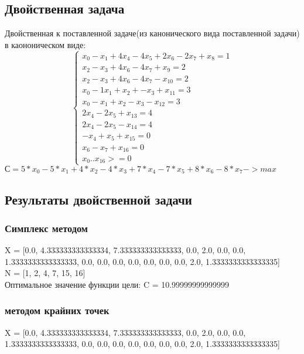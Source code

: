 \documentclass[a4]{article}
\begin{document}
			\subsection{Двойственная задача}
			Двойственная к поставленной задаче(из канонического вида поставленной задачи) в каононическом виде:
			\begin{equation*}
				\begin{cases}
					x_0 -x_1 + 4x_4 - 4x_5 + 2x_6 - 2x_7 + x_8 = 1\\
					x_2 - x_3 + 4x_6 - 4x_7 + x_9 = 2\\
					x_2 -x_3 + 4x_6 - 4x_7 - x_{10} = 2\\
					x_0 -1x_1 + x_2 + -x_3 + x_{11} = 3\\
					x_0 - x_1 + x_2 -x_3 - x_{12} = 3\\
					2x_4 - 2x_5 + x_{13} = 4\\
					2x_4 -2x_5 - x_{14} = 4\\
					-x_4 + x_5 + x_{15} = 0\\
					x_6 -x_7 + x_{16} = 0\\
					x_0.. x_{16} >= 0 
				\end{cases}
			\end{equation*}
			$С = 5*x_0 - 5*x_1 + 4*x_2 - 4*x_3 + 7*x_4 - 7*x_5 + 8*x_6 - 8*x_7->max$
			
			\subsection{Результаты двойственной задачи}
				\subsubsection{Симплекс методом}
					X = [0.0, 4.333333333333334, 7.333333333333333, 0.0, 2.0, 0.0, 0.0, 1.3333333333333333, 0.0, 0.0, 0.0, 0.0, 0.0, 0.0, 0.0, 2.0, 1.3333333333333335]\\
					
					N = [1, 2, 4, 7, 15, 16]\\
					
					Оптимальное значение функции цели: C = 10.99999999999999
				\subsubsection{методом крайних точек}
					X = [0.0, 4.333333333333334, 7.333333333333333, 0.0, 2.0, 0.0, 0.0, 1.3333333333333333, 0.0, 0.0, 0.0, 0.0, 0.0, 0.0, 0.0, 2.0, 1.3333333333333335]\\
					
\end{document}
